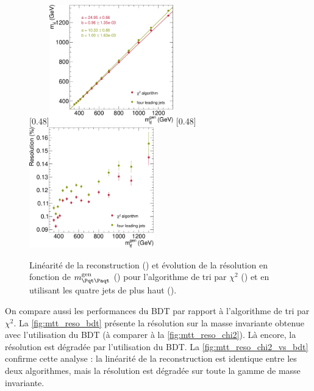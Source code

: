 \begin{figure}[tbp] \centering
    \subcaptionbox{\label{fig:mtt_response_chi2_vs_four_jets}}[0.48\textwidth]{\includegraphics[width=0.48\textwidth]{chapitre6/figs/mtt_response_vs_gen_comparison_chi2_four_jets.pdf}}\hfill
    \subcaptionbox{\label{fig:mtt_reso_vs_mtt_gen_chi2_vs_four_jets}}[0.48\textwidth]{\includegraphics[width=0.48\textwidth]{chapitre6/figs/mtt_resolution_vs_gen_comparison_chi2_four_jets.pdf}}
    \caption{Linéarité de la reconstruction () et évolution de la résolution en fonction de $\mtt^\text{gen}$ () pour l'algorithme de tri par $\chi^2$ (\rouge) et en utilisant les quatre jets de plus haut \pt (\vertc).}
    \label{fig:mtt_reso_chi2_vs_four_jets}
\end{figure}

\bigskip

On compare aussi les performances du BDT par rapport à l'algorithme de tri par $\chi^2$. La \cref{fig:mtt_reso_bdt} présente la résolution sur la masse invariante obtenue avec l'utilisation du BDT (à comparer à la \cref{fig:mtt_reso_chi2}). Là encore, la résolution est dégradée par l'utilisation du BDT. La \cref{fig:mtt_reso_chi2_vs_bdt} confirme cette analyse : la linéarité de la reconstruction est identique entre les deux algorithmes, mais la résolution est dégradée sur toute la gamme de masse invariante.

